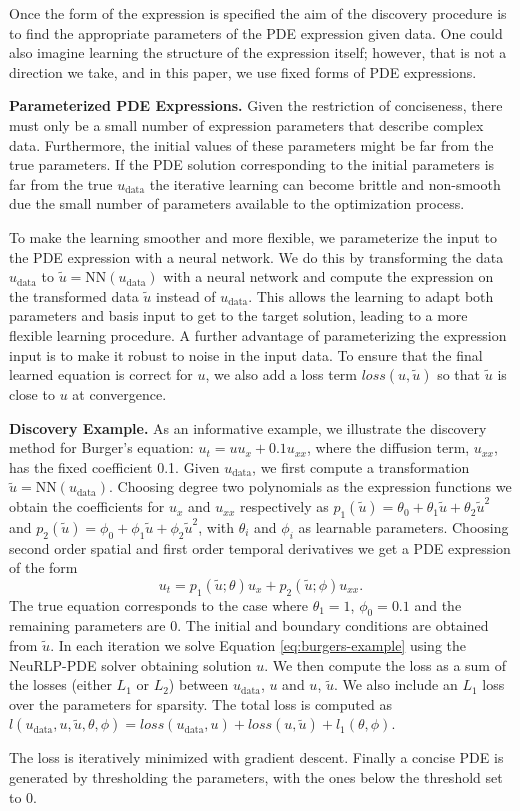 Once the form of the expression is specified the aim of the discovery procedure is to find the appropriate parameters of the PDE expression given data.
One could also imagine learning the structure of the expression itself; however, that is not a direction we take, and in this paper, we use fixed forms of PDE expressions.

\textbf{Parameterized PDE Expressions.} Given the restriction of conciseness, there must only be a small number of expression parameters that describe complex data. 
Furthermore, the initial values of these parameters might be far from the true parameters. 
If the PDE solution corresponding to the initial parameters is far from the true $u_\text{data}$ the iterative learning can become brittle and non-smooth due the small number of parameters available to the optimization process. 

To make the learning smoother and more flexible, we parameterize the input to the PDE expression with a neural network.
We do this by transforming the data $u_\text{data}$ to $\tilde{u} = \text{NN}(u_\text{data})$ with a neural network and compute the expression on the transformed data $\tilde{u}$ instead of $u_\text{data}$.
This allows the learning to adapt both parameters and basis input to get to the target solution, leading to a more flexible learning procedure.
A further advantage of parameterizing the expression input is to make it robust to noise in the input data.
To ensure that the final learned equation is correct for $u$, we also add a loss term $loss(u,\tilde{u})$ so that  $\tilde{u}$ is close to $u$ at convergence.

\begingroup
\setlength\abovedisplayskip{1.5pt}
\setlength\belowdisplayskip{1.5pt}
\textbf{Discovery Example.} As an informative example, we illustrate the discovery method for Burger's equation: $u_t = uu_x  + 0.1u_{xx}$, where the diffusion term, $u_{xx}$, has the fixed coefficient 0.1. 
Given $u_\text{data}$, we first compute a transformation $\tilde{u} = \text{NN}(u_\text{data})$. 
Choosing degree two polynomials as the expression functions we obtain the coefficients for $u_x$ and $u_{xx}$ respectively as $p_1(\tilde{u}) = \theta_{0} + \theta_{1}\tilde{u} + \theta_2 \tilde{u}^2 $ and $p_2(\tilde{u}) = \phi_0 + \phi_1 \tilde{u} + \phi_2 \tilde{u}^2$, with $\theta_i$ and $\phi_i$ as learnable parameters.
Choosing second order spatial and first order temporal derivatives we get a PDE expression of the form
\begin{equation}
u_t = p_1(\tilde{u}; \theta)u_x + p_2(\tilde{u}; \phi)u_{xx}. \label{eq:burgers-example}
\end{equation}
The true equation corresponds to the case where $\theta_1=1$, $\phi_0 = 0.1$ and the remaining parameters are 0.
The initial and boundary conditions are obtained from $\tilde{u}$.
In each iteration we solve Equation \ref{eq:burgers-example} using the NeuRLP-PDE solver obtaining solution $u$.
We then compute the loss  as a sum of the losses (either $L_1$ or $L_2$) between $u_\text{data}$, $u$ and $u$, $\tilde{u}$.
We also include an $L_1$ loss over the parameters for sparsity. 
The total loss is computed as $l(u_\text{data},u,\tilde{u}, \theta,\phi) = loss(u_\text{data},u) + loss(u,\tilde{u}) + l_1(\theta, \phi)$.
\endgroup

The loss is iteratively minimized with gradient descent.
Finally a concise PDE is generated by thresholding the parameters, with the ones below the threshold set to 0.


